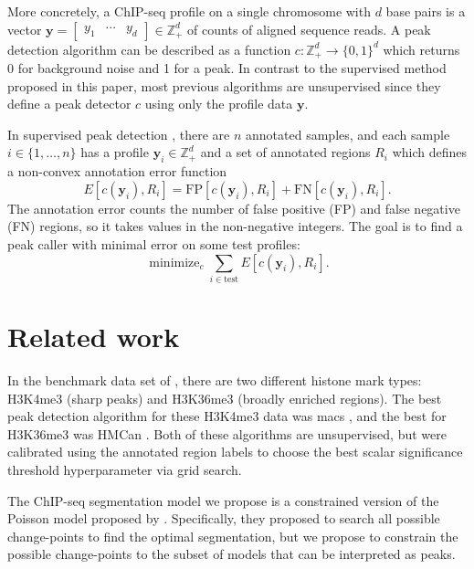 \documentclass{article}
\DeclareMathOperator*{\minimize}{minimize}
\newcommand{\ZZ}{\mathbb Z}
\begin{document}
More concretely, a ChIP-seq profile on a single
chromosome with $d$ base pairs is a vector $\mathbf y=
\left[
  \begin{array}{ccc}
    y_1 & \cdots & y_d
  \end{array}
\right]\in\ZZ_+^d$ of counts of aligned sequence reads. A peak
detection algorithm can be described as a function $c:\ZZ_+^d
\rightarrow \{0, 1\}^d$ which returns 0 for background noise and 1 for
a peak. In contrast to the supervised method proposed in this paper,
most previous algorithms are unsupervised since they define a peak
detector $c$ using only the profile data $\mathbf y$.

In supervised peak detection \citep{hocking2014visual}, there
are $n$ annotated samples, and each sample $i\in\{1, \dots, n\}$ has a
profile $\mathbf y_i\in\ZZ_+^d$ and a set of annotated regions $R_i$
which defines a non-convex annotation error function
\begin{equation}
  \label{eq:error}
  E[c(\mathbf y_i),  R_i] =
  \text{FP}[c(\mathbf y_i), R_i] +
  \text{FN}[c(\mathbf y_i), R_i].
\end{equation}
The annotation error counts the number of false positive (FP) and
false negative (FN) regions, so it takes values in the non-negative
integers. The goal is to find a peak caller with minimal error on some
test profiles:
\begin{equation}
  \label{eq:min_error}
  \minimize_c \sum_{i\in\text{test}} E[c(\mathbf y_i),  R_i].
\end{equation}

\section{Related work}

In the benchmark data set of \citet{hocking2014visual}, there are two
different histone mark types: H3K4me3 (sharp peaks) and H3K36me3
(broadly enriched regions). The best peak detection algorithm for
these H3K4me3 data was macs \citep{MACS}, and the best for H3K36me3
was HMCan \citep{HMCan}. Both of these algorithms are unsupervised,
but were calibrated using the annotated region labels to choose the
best scalar significance threshold hyperparameter via grid search.

The ChIP-seq segmentation model we propose is a constrained version of
the Poisson model proposed by \citet{Segmentor}. Specifically,
they proposed to search all possible change-points to find the optimal
segmentation, but we propose to constrain the possible change-points to
the subset of models that can be interpreted as peaks.
\end{document}
